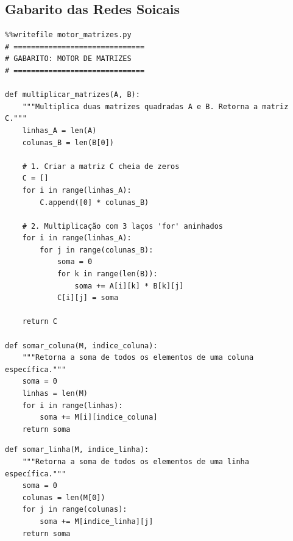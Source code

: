 \documentclass[../numerical_methods.tex]{subfiles}
\begin{document}
\subsection{Gabarito das Redes Soicais}
\begin{listing}[H]
	\begin{verbatim}
%%writefile motor_matrizes.py
# ==============================
# GABARITO: MOTOR DE MATRIZES
# ==============================

def multiplicar_matrizes(A, B):
    """Multiplica duas matrizes quadradas A e B. Retorna a matriz C."""
    linhas_A = len(A)
    colunas_B = len(B[0])

    # 1. Criar a matriz C cheia de zeros
    C = []
    for i in range(linhas_A):
        C.append([0] * colunas_B)

    # 2. Multiplicação com 3 laços 'for' aninhados
    for i in range(linhas_A):
        for j in range(colunas_B):
            soma = 0
            for k in range(len(B)):
                soma += A[i][k] * B[k][j]
            C[i][j] = soma

    return C

def somar_coluna(M, indice_coluna):
    """Retorna a soma de todos os elementos de uma coluna específica."""
    soma = 0
    linhas = len(M)
    for i in range(linhas):
        soma += M[i][indice_coluna]
    return soma
\end{verbatim}
\end{listing}

\begin{verbatim}
def somar_linha(M, indice_linha):
    """Retorna a soma de todos os elementos de uma linha específica."""
    soma = 0
    colunas = len(M[0])
    for j in range(colunas):
        soma += M[indice_linha][j]
    return soma
\end{verbatim}
\end{document}
